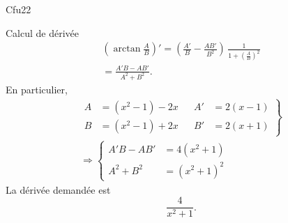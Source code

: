 \begin{tiny}Cfu22\end{tiny}  Calcul de dérivée
\begin{multline*}
  \left( \arctan \frac{A}{B} \right)'
  = \left(\frac{A'}{B} - \frac{AB'}{B^2}\right)\, \frac{1}{1 + \left(\frac{A}{B}\right)^2}\\
  = \frac{A'B - A B'}{A^2 + B^2}.
\end{multline*}
En particulier,
\begin{multline*}
\left.
\begin{aligned}
  A &= (x^2-1) - 2x & & A' &= 2(x-1)\\
  B &= (x^2-1) + 2x & & B' &= 2(x+1)
\end{aligned} 
\right\rbrace
\\ \Rightarrow
\left\lbrace
\begin{aligned}
  A'B - AB' &= 4(x^2+1)\\
  A^2 + B^2 &= (x^2+1)^2
\end{aligned}
\right.
\end{multline*}
La dérivée demandée est
\[
  \frac{4}{x^2 + 1}.
\]
